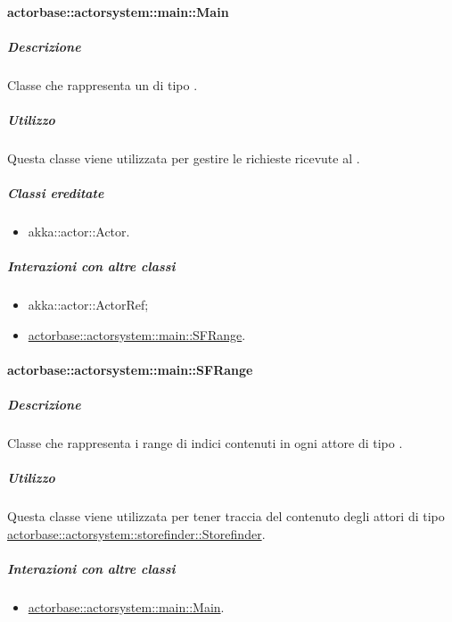 \documentclass{scalatekids-article}
\begin{document}
\paragraph{actorbase::actorsystem::main::Main}
\label{sec:actorbase::actorsystem::main::Main}

\subparagraph{Descrizione}

Classe che rappresenta un  di tipo .

\subparagraph{Utilizzo}

Questa classe viene utilizzata per gestire le richieste ricevute al
.

\subparagraph{Classi ereditate}

\begin{itemize}

\item akka::actor::Actor.

\end{itemize}

\subparagraph{Interazioni con altre classi}

\begin{itemize}
\item akka::actor::ActorRef;
\item \hyperref[sec:actorbase::actorsystem::main::SFRange]{actorbase::actorsystem::main::SFRange}.
\end{itemize}

\paragraph{actorbase::actorsystem::main::SFRange}
\label{sec:actorbase::actorsystem::main::SFRange}

\subparagraph{Descrizione}

Classe che rappresenta i range di indici contenuti in ogni attore di tipo
.

\subparagraph{Utilizzo}

Questa classe viene utilizzata per tener traccia del contenuto degli attori di tipo
\hyperref[sec:actorbase::actorsystem::storefinder::Storefinder]{actorbase::\allowbreak{}actorsystem::\allowbreak{}storefinder::\allowbreak{}Storefinder}.

\subparagraph{Interazioni con altre classi}

\begin{itemize}
\item \hyperref[sec:actorbase::actorsystem::main::Main]{actorbase::actorsystem::main::Main}.
\end{itemize}
\end{document}
